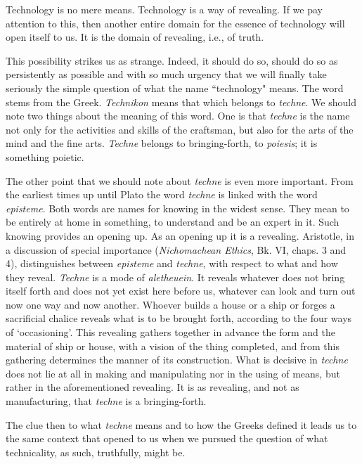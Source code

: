 \documentclass[12pt]{article}
\begin{document}
Technology is no mere means. Technology is a way of revealing. If we pay attention to this, then another entire domain for the essence of technology will open itself to us. It is the domain of revealing, i.e., of truth.

This possibility strikes us as strange. Indeed, it should do so, should do so as persistently as possible and with so much urgency that we will finally take seriously the simple question of what the name ``technology" means. The word stems from the Greek. \textit{Technikon} means that which belongs to \textit{techn{\-e}}. We should note two things about the meaning of this word. One is that \textit{techn{\-e}} is the name not only for the activities and skills of the craftsman, but also for the arts of the mind and the fine arts. \textit{Techn{\-e}} belongs to bringing-forth, to \textit{poi{\-e}sis}; it is something poietic.

The other point that we should note about \textit{techn{\-e}} is even more important. From the earliest times up until Plato the word \textit{techn{\-e}} is linked with the word \textit{epist{\-e}m{\-e}}. Both words are names for knowing in the widest sense. They mean to be entirely at home in something, to understand and be an expert in it. Such knowing provides an opening up. As an opening up it is a revealing. Aristotle, in a discussion of special importance (\textit{Nichomachean Ethics}, Bk. VI, chaps. 3 and 4), distinguishes between \textit{epist{\-e}m{\-e}} and \textit{techn{\-e}}, with respect to what and how they reveal. \textit{Techn{\-e}} is a mode of \textit{al{\-e}theuein}. It reveals whatever does not bring itself forth and does not yet exist here before us, whatever can look and turn out now one way and now another. Whoever builds a house or a ship or forges a sacrificial chalice reveals what is to be brought forth, according to the four ways of `occasioning'. This revealing gathers together in advance the form and the material of ship or house, with a vision of the thing completed, and from this gathering determines the manner of its construction. What is decisive in \textit{techn{\-e}} does not lie at all in making and manipulating nor in the using of means, but rather in the aforementioned revealing. It is as revealing, and not as manufacturing, that \textit{techn{\-e}} is a bringing-forth.

The clue then to what \textit{techn{\-e}} means and to how the Greeks defined it leads us to the same context that opened to us when we pursued the question of what technicality, as such, truthfully, might be.
\end{document}
